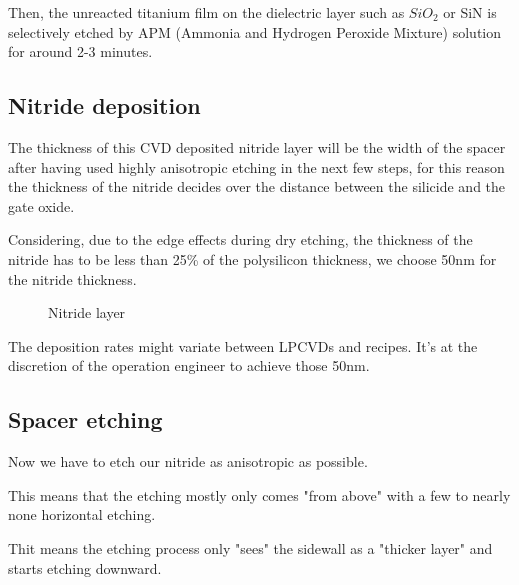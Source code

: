 Then, the unreacted titanium film on the dielectric layer such as $SiO_2$ or SiN is selectively etched by APM (Ammonia and Hydrogen Peroxide Mixture) solution for around 2-3 minutes.

\newpage

\subsection{Nitride deposition}\label{nitride_spacers_deposition}

The thickness of this CVD deposited nitride layer will be the width of the spacer after having used highly anisotropic etching in the next few steps, for this reason the thickness of the nitride decides over the distance between the silicide and the gate oxide.

Considering, due to the edge effects during dry etching, the thickness of the nitride has to be less than 25\% of the polysilicon thickness, we choose 50nm for the nitride thickness.

\begin{figure}[H]
	\centering
	\begin{tikzpicture}[node distance = 3cm, auto, thick,scale=\CrossSectionOnly, every node/.style={transform shape}]
		
	\end{tikzpicture}
	\begin{tikzpicture}[node distance = 3cm, auto, thick,scale=\CrossSectionOnly, every node/.style={transform shape}]
		
	\end{tikzpicture}
	\caption{Nitride layer}
\end{figure}

The deposition rates might variate between LPCVDs and recipes. It's at the discretion of the operation engineer to achieve those 50nm.

\subsection{Spacer etching}

Now we have to etch our nitride as anisotropic as possible.

This means that the etching mostly only comes "from above" with a few to nearly none horizontal etching.

Thit means the etching process only "sees" the sidewall as a "thicker layer" and starts etching downward.


